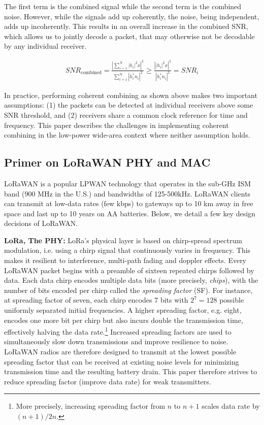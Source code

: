 The first term is the combined signal while the second term is the combined
noise. However, while the signals add up coherently, the noise, being
independent, adds up incoherently. This results in an overall increase in the
combined SNR, which allows us to jointly decode a packet, that may otherwise
not be decodable by any individual receiver.

\compactimg

\begin{align*}
SNR_{\text{combined}} %
	= \frac{\left| \sum_{i=1}^N \left| h_i \right|^2 x \right|^2}{\sum_{i=1}^N \left| h^*_i n_i \right|^2} 
	\geq \frac{\left| \left| h_i \right|^2 x \right|^2}{\left| h^*_i n_i \right|^2} = SNR_i
\end{align*}

In practice, performing coherent combining as shown above makes two important
assumptions: (1) the packets can be detected at individual receivers above
some SNR threshold, and (2) receivers share a common clock reference for time
and frequency. This paper describes the challenges in implementing coherent
combining in the low-power wide-area context where neither assumption holds.


\subsection{Primer on LoRaWAN PHY and MAC}
\label{sec:lora}

LoRaWAN is a popular LPWAN technology that operates in the sub-GHz ISM band
(900 MHz in the U.S.) and bandwidths of 125-500kHz. LoRaWAN clients can
transmit at low-data rates (few kbps) to gateways up to 10 km away in free
space and last up to 10 years on AA batteries. Below, we detail a few key
design decisions of LoRaWAN.

\noindent \textbf{LoRa, The PHY: } LoRa's physical layer is based on
chirp-spread spectrum modulation, i.e. using a chirp signal that continuously
varies in frequency. This makes it resilient to interference, multi-path
fading and doppler effects. Every LoRaWAN packet begins with a preamble of
sixteen repeated chirps followed by data. Each data chirp encodes multiple
data bits (more precisely, \textit{chips}), with the number of  bits encoded
per chirp called the \textit{spreading factor} (SF). For instance, at
spreading factor of seven, each chirp encodes 7 bits with $2^7 = 128$ possible
uniformly separated initial frequencies. A higher spreading factor, e.g.
eight, encodes one more bit per chirp but also incurs double the transmission
time, effectively halving the data rate.\footnote{More precisely, increasing
spreading factor from $n$ to $n+1$ scales data rate by $(n+1)/2n$.} Increased
spreading factors are used to simultaneously slow down transmissions and
improve resilience to noise. LoRaWAN radios are therefore designed to transmit
at the lowest possible spreading factor that can be received at existing noise
levels for minimizing transmission time and the resulting battery drain. This
paper therefore strives to reduce spreading factor (improve data rate) for
weak transmitters.

